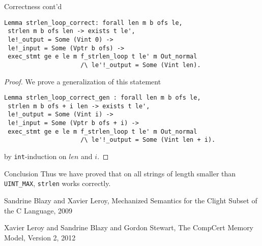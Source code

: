\documentclass{beamer}
\begin{document}
  
\begin{frame}[fragile]{Correctness cont'd}

  
  
  \begin{lstlisting}[language=Coq]
 Lemma strlen_loop_correct: forall len m b ofs le,
 strlen m b ofs len -> exists t le',
 le!_output = Some (Vint 0) ->
 le!_input = Some (Vptr b ofs) ->
 exec_stmt ge e le m f_strlen_loop t le' m Out_normal
                     /\ le'!_output = Some (Vint len).
\end{lstlisting}

\begin{proof}
  We prove a generalization of this statement
  
 \begin{lstlisting}[language=Coq]
 Lemma strlen_loop_correct_gen : forall len m b ofs le,
 strlen m b ofs + i len -> exists t le',
 le!_output = Some (Vint i) ->
 le!_input = Some (Vptr b ofs + i) ->
 exec_stmt ge e le m f_strlen_loop t le' m Out_normal
                     /\ le'!_output = Some (Vint len + i).
\end{lstlisting}

by \texttt{int}-induction on $len$ and $i$. 

  \end{proof}

 



\end{frame}

\begin{frame}{Conclusion}
  Thus we have proved that on all strings of length smaller than
  \texttt{UINT\_MAX}, \texttt{strlen} works correctly. 
  
  \end{frame}

 

\begin{frame}
    \begin{thebibliography}{9}

    {Sandrine Blazy and Xavier Leroy},
    {Mechanized Semantics for the Clight Subset of the C Language},
    {2009}
      
    Xavier Leroy and Sandrine Blazy and Gordon Stewart,
    {The CompCert Memory Model, Version 2},
    {2012}

   

\end{thebibliography}
  
  \end{frame}
    
\end{document}

